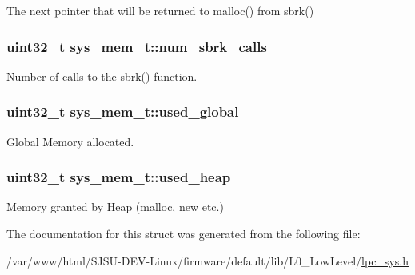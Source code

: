 The next pointer that will be returned to malloc() from sbrk() 

\subsubsection[{\texorpdfstring{num\+\_\+sbrk\+\_\+calls}{num_sbrk_calls}}]{\setlength{\rightskip}{0pt plus 5cm}uint32\+\_\+t sys\+\_\+mem\+\_\+t\+::num\+\_\+sbrk\+\_\+calls}\hypertarget{structsys__mem__t_a14e38b193706a5f4168d28394a19e1b8}{}\label{structsys__mem__t_a14e38b193706a5f4168d28394a19e1b8}


Number of calls to the sbrk() function. 

\subsubsection[{\texorpdfstring{used\+\_\+global}{used_global}}]{\setlength{\rightskip}{0pt plus 5cm}uint32\+\_\+t sys\+\_\+mem\+\_\+t\+::used\+\_\+global}\hypertarget{structsys__mem__t_a2a50937f3383927bd97862e45ee51cbd}{}\label{structsys__mem__t_a2a50937f3383927bd97862e45ee51cbd}


Global Memory allocated. 

\subsubsection[{\texorpdfstring{used\+\_\+heap}{used_heap}}]{\setlength{\rightskip}{0pt plus 5cm}uint32\+\_\+t sys\+\_\+mem\+\_\+t\+::used\+\_\+heap}\hypertarget{structsys__mem__t_a993a5c256a5b499a37e2e8e0028412ac}{}\label{structsys__mem__t_a993a5c256a5b499a37e2e8e0028412ac}


Memory granted by Heap (malloc, new etc.) 



The documentation for this struct was generated from the following file\+:\begin{DoxyCompactItemize}
\item 
/var/www/html/\+S\+J\+S\+U-\/\+D\+E\+V-\/\+Linux/firmware/default/lib/\+L0\+\_\+\+Low\+Level/\hyperlink{lpc__sys_8h}{lpc\+\_\+sys.\+h}\end{DoxyCompactItemize}
